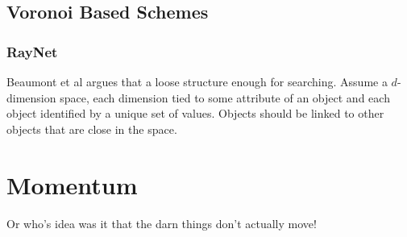 \documentclass[10pt,letterpaper]{report}
\begin{document}
\section{Voronoi Based Schemes}

\subsection{RayNet}

Beaumont et al argues that a loose structure enough for searching.  Assume a $d$-dimension space, each dimension tied to some attribute of an object and each object identified by a unique set of values.  Objects should be linked to other objects that are close in the space.

\chapter{Momentum}
Or who's idea was it that the darn things don't actually move!
\end{document}
